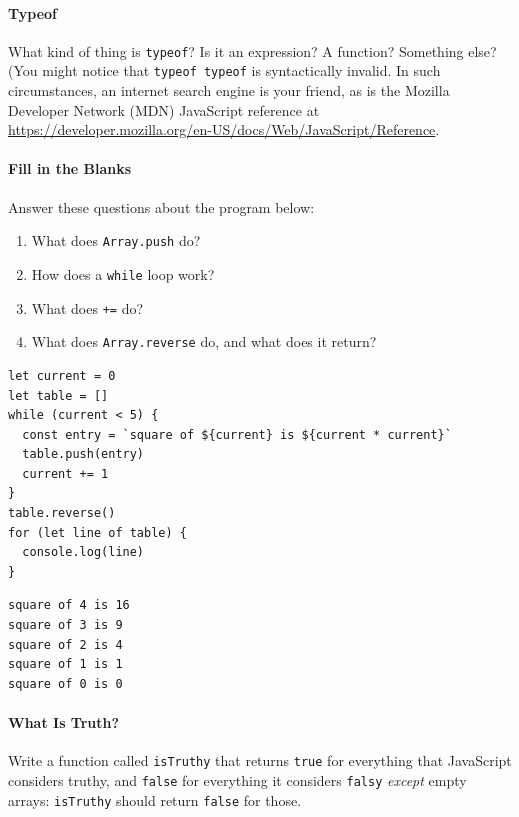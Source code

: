 \paragraph{Typeof}\label{typeof}

What kind of thing is \texttt{typeof}? Is it an expression? A function?
Something else? (You might notice that \texttt{typeof\ typeof} is
syntactically invalid. In such circumstances, an internet search engine
is your friend, as is the Mozilla Developer Network (MDN) JavaScript
reference at
\url{https://developer.mozilla.org/en-US/docs/Web/JavaScript/Reference}.

\paragraph{Fill in the Blanks}\label{fill-in-the-blanks}

Answer these questions about the program below:

\begin{enumerate}
\tightlist
\item
  What does \texttt{Array.push} do?
\item
  How does a \texttt{while} loop work?
\item
  What does \texttt{+=} do?
\item
  What does \texttt{Array.reverse} do, and what does it return?
\end{enumerate}

\begin{verbatim}
let current = 0
let table = []
while (current < 5) {
  const entry = `square of ${current} is ${current * current}`
  table.push(entry)
  current += 1
}
table.reverse()
for (let line of table) {
  console.log(line)
}
\end{verbatim}

\begin{verbatim}
square of 4 is 16
square of 3 is 9
square of 2 is 4
square of 1 is 1
square of 0 is 0
\end{verbatim}

\paragraph{What Is Truth?}\label{what-is-truth}

Write a function called \texttt{isTruthy} that returns \texttt{true} for
everything that JavaScript considers truthy, and \texttt{false} for
everything it considers \texttt{falsy} \emph{except} empty arrays:
\texttt{isTruthy} should return \texttt{false} for those.

